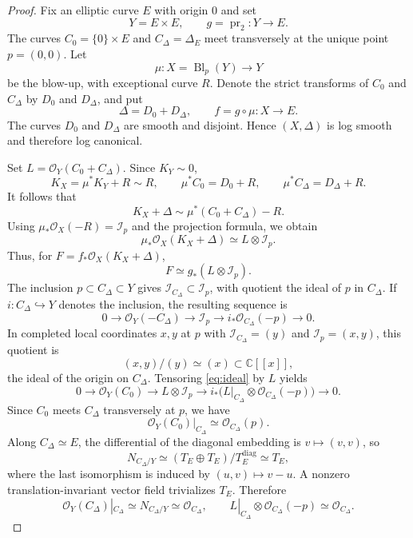 \documentclass[10pt,a4paper]{amsart}
\newcommand{\OO}{\mathcal O}
\newcommand{\II}{\mathcal I}
\newcommand{\CC}{\mathbb C}
\DeclareMathOperator{\pr}{pr}
\DeclareMathOperator{\Bl}{Bl}
\begin{document}
\begin{proof}
Fix an elliptic curve $E$ with origin $0$ and set
\[
Y=E\times E,\qquad g=\pr_2:Y\longrightarrow E.
\]
The curves $C_0=\{0\}\times E$ and $C_\Delta=\Delta_E$ meet transversely at the unique point $p=(0,0)$. Let
\[
\mu:X=\Bl_p(Y)\longrightarrow Y
\]
be the blow-up, with exceptional curve $R$. Denote the strict transforms of $C_0$ and $C_\Delta$ by $D_0$ and $D_\Delta$, and put
\[
\Delta=D_0+D_\Delta,\qquad f=g\circ\mu:X\longrightarrow E.
\]
The curves $D_0$ and $D_\Delta$ are smooth and disjoint. Hence $(X,\Delta)$ is log smooth and therefore log canonical.

Set $L=\OO_Y(C_0+C_\Delta)$. Since $K_Y\sim0$,
\[
K_X=\mu^*K_Y+R\sim R,\qquad \mu^*C_0=D_0+R,\qquad \mu^*C_\Delta=D_\Delta+R.
\]
It follows that
\[
K_X+\Delta\sim\mu^*(C_0+C_\Delta)-R.
\]
Using $\mu_*\OO_X(-R)=\II_p$ and the projection formula, we obtain
\[
\mu_*\OO_X(K_X+\Delta)\simeq L\otimes\II_p.
\]
Thus, for $F=f_*\OO_X(K_X+\Delta)$,
\begin{equation}\label{eq:F}
F\simeq g_*(L\otimes\II_p).
\end{equation}
The inclusion $p\subset C_\Delta\subset Y$ gives $\II_{C_\Delta}\subset\II_p$, with quotient the ideal of $p$ in $C_\Delta$. If $i:C_\Delta\hookrightarrow Y$ denotes the inclusion, the resulting sequence is
\begin{equation}\label{eq:ideal}
0\longrightarrow\OO_Y(-C_\Delta)\longrightarrow\II_p\longrightarrow i_*\OO_{C_\Delta}(-p)\longrightarrow0.
\end{equation}
In completed local coordinates $x,y$ at $p$ with $\II_{C_\Delta}=(y)$ and $\II_p=(x,y)$, this quotient is
\[
(x,y)/(y)\simeq(x)\subset\CC[[x]],
\]
the ideal of the origin on $C_\Delta$. Tensoring \eqref{eq:ideal} by $L$ yields
\begin{equation}\label{eq:restriction}
0\longrightarrow\OO_Y(C_0)\longrightarrow L\otimes\II_p
\longrightarrow i_*\bigl(L|_{C_\Delta}\otimes\OO_{C_\Delta}(-p)\bigr)\longrightarrow0.
\end{equation}
Since $C_0$ meets $C_\Delta$ transversely at $p$, we have
\[
\OO_Y(C_0)|_{C_\Delta}\simeq\OO_{C_\Delta}(p).
\]
Along $C_\Delta\simeq E$, the differential of the diagonal embedding is $v\mapsto(v,v)$, so
\[
N_{C_\Delta/Y}\simeq(T_E\oplus T_E)/T_E^{\mathrm{diag}}\simeq T_E,
\]
where the last isomorphism is induced by $(u,v)\mapsto v-u$. A nonzero translation-invariant vector field trivializes $T_E$. Therefore
\[
\OO_Y(C_\Delta)|_{C_\Delta}\simeq N_{C_\Delta/Y}\simeq\OO_{C_\Delta},
\qquad L|_{C_\Delta}\otimes\OO_{C_\Delta}(-p)\simeq\OO_{C_\Delta}.
\]
\end{proof}
\end{document}
